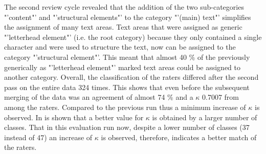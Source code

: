 \documentclass[11pt,a4paper]{article}
\begin{document}

The second review cycle revealed that the addition of the two sub-categories "'content"' and "'structural elements"' to the category "'(main) text"' simplifies the assignment of many text areas. Text areas that were assigned as generic "'letterhead element"' (i.e. the root category) because they only contained a single character and were used to structure the text, now can be assigned to the category "'structural element"'. This meant that almost 40 \% of the previously generically as "'letterhead element"' marked text areas could be assigned to another category. Overall, the classification of the raters differed after the second pass on the entire data 324 times. This shows that even before the subsequent merging of the data was an agreement of almost 74 \% and a $\kappa$ 0.7007 from among the raters. Compared to the previous run thus a minimum increase of $\kappa$ is observed. In  is shown that a better value for $\kappa$ is obtained by a larger number of classes. That in this evaluation run now, despite a lower number of classes (37 instead of 47) an increase of $\kappa$ is observed, therefore, indicates a better match of the raters.
\end{document}
